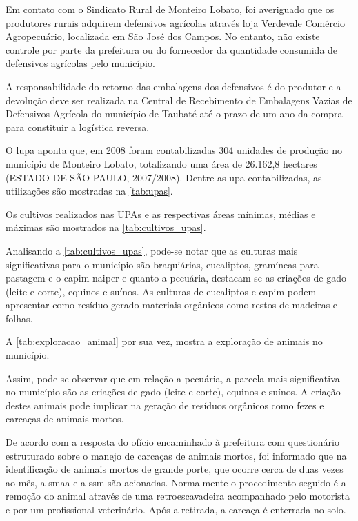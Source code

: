 Em contato com o Sindicato Rural de Monteiro Lobato, foi averiguado que os produtores rurais adquirem defensivos agrícolas através loja Verdevale Comércio Agropecuário, localizada em São José dos Campos. No entanto, não existe controle por parte da prefeitura ou do fornecedor da quantidade consumida de defensivos agrícolas pelo município. 

A responsabilidade do retorno das embalagens dos defensivos é do produtor e a devolução deve ser realizada na Central de Recebimento de Embalagens Vazias de Defensivos Agrícola do município de Taubaté até o prazo de um ano da compra para constituir a logística reversa.

O \gls{lupa} aponta que, em 2008 foram contabilizadas 304 unidades de produção no município de Monteiro Lobato, totalizando uma área de 26.162,8 hectares (ESTADO DE SÃO PAULO, 2007/2008). Dentre as \gls{upa} contabilizadas, as utilizações são mostradas na \autoref{tab:upas}.



Os cultivos realizados nas UPAs e as respectivas áreas mínimas, médias e máximas são mostrados na \autoref{tab:cultivos_upas}.



Analisando a \autoref{tab:cultivos_upas}, pode-se notar que as culturas mais significativas para o município são braquiárias, eucaliptos, gramíneas para pastagem e o capim-naiper e quanto a pecuária, destacam-se as criações de gado (leite e corte), equinos e suínos. As culturas de eucaliptos e capim podem apresentar como resíduo gerado materiais orgânicos como restos de madeiras e folhas.

A \autoref{tab:exploracao_animal} por sua vez, mostra a exploração de animais no município.



Assim, pode-se observar que em relação a pecuária, a parcela mais significativa no município são as criações de gado (leite e corte), equinos e suínos. A criação destes animais pode implicar na geração de resíduos orgânicos como fezes e carcaças de animais mortos.

De acordo com a resposta do ofício encaminhado à prefeitura com questionário estruturado sobre o manejo de carcaças de animais mortos, foi informado que na identificação de animais mortos de grande porte, que ocorre cerca de duas vezes ao mês, a \gls{smaa} e a \gls{ssm} são acionadas. Normalmente o procedimento seguido é a remoção do animal através de uma retroescavadeira acompanhado pelo motorista e por um profissional veterinário. Após a retirada, a carcaça é enterrada no solo.

